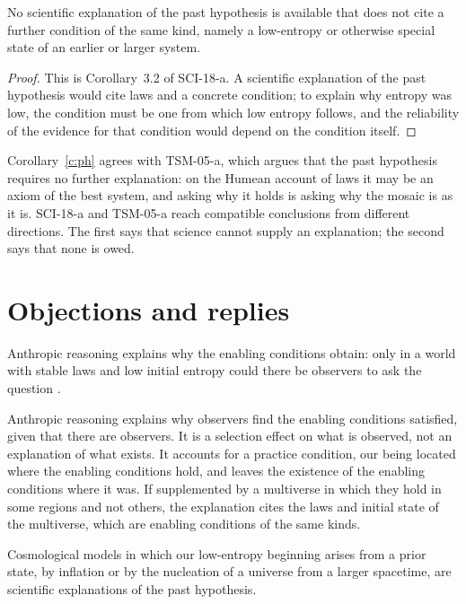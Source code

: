 \documentclass{situationist-preprint}
\begin{document}
\begin{corollary}\label{c:ph}
No scientific explanation of the past hypothesis is available that does not cite a further condition of the same kind, namely a low-entropy or otherwise special state of an earlier or larger system.
\end{corollary}

\begin{proof}
This is Corollary~3.2 of SCI-18-a. A scientific explanation of the past hypothesis would cite laws and a concrete condition; to explain why entropy was low, the condition must be one from which low entropy follows, and the reliability of the evidence for that condition would depend on the condition itself.
\end{proof}

Corollary~\ref{c:ph} agrees with TSM-05-a, which argues that the past hypothesis requires no further explanation: on the Humean account of laws it may be an axiom of the best system, and asking why it holds is asking why the mosaic is as it is. SCI-18-a and TSM-05-a reach compatible conclusions from different directions. The first says that science cannot supply an explanation; the second says that none is owed.

\section{Objections and replies}

\begin{objection}
Anthropic reasoning explains why the enabling conditions obtain: only in a world with stable laws and low initial entropy could there be observers to ask the question \citep{Carter1974}.
\end{objection}

\begin{reply}
Anthropic reasoning explains why observers find the enabling conditions satisfied, given that there are observers. It is a selection effect on what is observed, not an explanation of what exists. It accounts for a practice condition, our being located where the enabling conditions hold, and leaves the existence of the enabling conditions where it was. If supplemented by a multiverse in which they hold in some regions and not others, the explanation cites the laws and initial state of the multiverse, which are enabling conditions of the same kinds.
\end{reply}

\begin{objection}
Cosmological models in which our low-entropy beginning arises from a prior state, by inflation or by the nucleation of a universe from a larger spacetime, are scientific explanations of the past hypothesis.
\end{objection}
\end{document}
